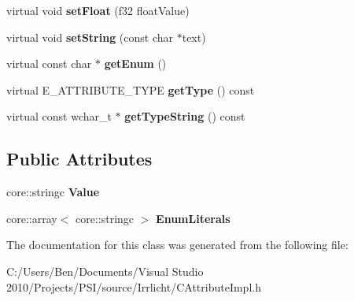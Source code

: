 \begin{DoxyCompactItemize}
\item 
\hypertarget{classirr_1_1io_1_1_c_enum_attribute_a68724223cb8d89da6776ceb905e2f190}{virtual void {\bfseries set\-Float} (f32 float\-Value)}\label{classirr_1_1io_1_1_c_enum_attribute_a68724223cb8d89da6776ceb905e2f190}

\item 
\hypertarget{classirr_1_1io_1_1_c_enum_attribute_ab84b9e08b496d4a7b8d1592efb81199c}{virtual void {\bfseries set\-String} (const char $\ast$text)}\label{classirr_1_1io_1_1_c_enum_attribute_ab84b9e08b496d4a7b8d1592efb81199c}

\item 
\hypertarget{classirr_1_1io_1_1_c_enum_attribute_a8b9c0c1b1736c0799f510050973a5171}{virtual const char $\ast$ {\bfseries get\-Enum} ()}\label{classirr_1_1io_1_1_c_enum_attribute_a8b9c0c1b1736c0799f510050973a5171}

\item 
\hypertarget{classirr_1_1io_1_1_c_enum_attribute_a75d08915d2dbbdaea11152c2eeed3127}{virtual E\-\_\-\-A\-T\-T\-R\-I\-B\-U\-T\-E\-\_\-\-T\-Y\-P\-E {\bfseries get\-Type} () const }\label{classirr_1_1io_1_1_c_enum_attribute_a75d08915d2dbbdaea11152c2eeed3127}

\item 
\hypertarget{classirr_1_1io_1_1_c_enum_attribute_a7560d588ccc18086ab28221a78b0edca}{virtual const wchar\-\_\-t $\ast$ {\bfseries get\-Type\-String} () const }\label{classirr_1_1io_1_1_c_enum_attribute_a7560d588ccc18086ab28221a78b0edca}

\end{DoxyCompactItemize}
\subsection*{Public Attributes}
\begin{DoxyCompactItemize}
\item 
\hypertarget{classirr_1_1io_1_1_c_enum_attribute_a50fd1746bd8268f3534bd0f5804884e6}{core\-::stringc {\bfseries Value}}\label{classirr_1_1io_1_1_c_enum_attribute_a50fd1746bd8268f3534bd0f5804884e6}

\item 
\hypertarget{classirr_1_1io_1_1_c_enum_attribute_a57baf7b7c294b690696ee40dc8a0d294}{core\-::array$<$ core\-::stringc $>$ {\bfseries Enum\-Literals}}\label{classirr_1_1io_1_1_c_enum_attribute_a57baf7b7c294b690696ee40dc8a0d294}

\end{DoxyCompactItemize}


The documentation for this class was generated from the following file\-:\begin{DoxyCompactItemize}
\item 
C\-:/\-Users/\-Ben/\-Documents/\-Visual Studio 2010/\-Projects/\-P\-S\-I/source/\-Irrlicht/C\-Attribute\-Impl.\-h\end{DoxyCompactItemize}
